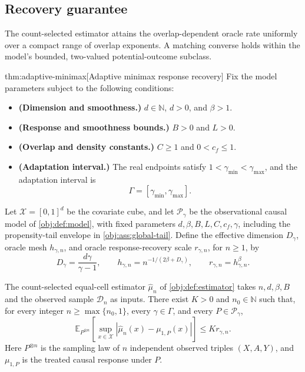 \documentclass[11pt]{article}
\begin{document}
\subsection{Recovery guarantee}

The count-selected estimator attains the overlap-dependent oracle rate uniformly over a compact range of overlap exponents. A matching converse holds within the model's bounded, two-valued potential-outcome subclass.

\begin{theoremv}{thm:adaptive-minimax}[Adaptive minimax response recovery]
Fix the model parameters subject to the following conditions:
\begin{itemize}
\item \textbf{(Dimension and smoothness.)} \(d\in\mathbb N\), \(d>0\), and \(\beta>1\).
\item \textbf{(Response and smoothness bounds.)} \(B>0\) and \(L>0\).
\item \textbf{(Overlap and density constants.)} \(C\ge1\) and \(0<c_f\le1\).
\item \textbf{(Adaptation interval.)} The real endpoints satisfy \(1<\gamma_{\min}<\gamma_{\max}\), and the adaptation interval is
\[
\Gamma=[\gamma_{\min},\gamma_{\max}].
\]
\end{itemize}
Let \(\mathcal X=[0,1]^d\) be the covariate cube, and let \(\mathcal P_\gamma\) be the observational causal model of \cref{obj:def:model}, with fixed parameters \(d,\beta,B,L,C,c_f,\gamma\), including the propensity-tail envelope in \cref{obj:ass:global-tail}. Define the effective dimension \(D_\gamma\), oracle mesh \(h_{\gamma,n}\), and oracle response-recovery scale \(r_{\gamma,n}\), for \(n\ge1\), by
\[
D_\gamma=\frac{d\gamma}{\gamma-1},
\qquad
h_{\gamma,n}=n^{-1/(2\beta+D_\gamma)},
\qquad
r_{\gamma,n}=h_{\gamma,n}^{\beta}.
\]

The count-selected equal-cell estimator \(\widehat\mu_n\) of \cref{obj:def:estimator} takes \(n,d,\beta,B\) and the observed sample \(\mathcal D_n\) as inputs. There exist \(K>0\) and \(n_0\in\mathbb N\) such that, for every integer \(n\ge\max\{n_0,1\}\), every \(\gamma\in\Gamma\), and every \(P\in\mathcal P_\gamma\),
\[
\mathbb E_{P^{\otimes n}}
\left[
\sup_{x\in\mathcal X}
\left|\widehat\mu_n(x)-\mu_{1,P}(x)\right|
\right]
\le K r_{\gamma,n}.
\]
Here \(P^{\otimes n}\) is the sampling law of \(n\) independent observed triples \((X,A,Y)\), and \(\mu_{1,P}\) is the treated causal response under \(P\).


\end{theoremv}
\end{document}
